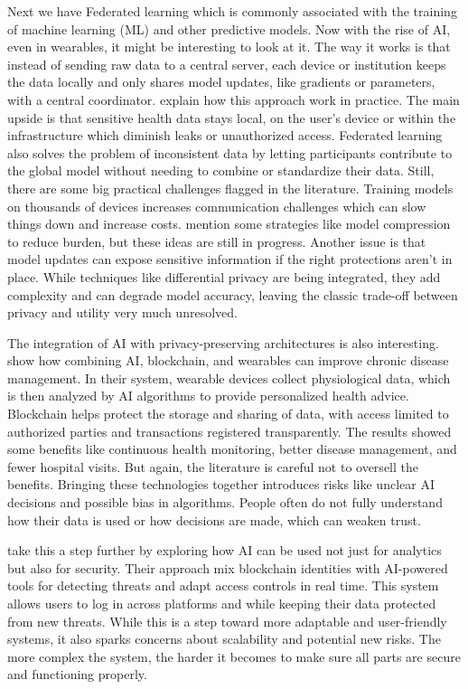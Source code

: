 	Next we have Federated learning which is commonly associated with the training of machine learning (ML) and other predictive models. Now with the rise of AI, even in wearables, it might be interesting to look at it. The way it works is that instead of sending raw data to a central server, each device or institution keeps the data locally and only shares model updates, like gradients or parameters, with a central coordinator. \cite{Xu2021} explain how this approach work in practice. The main upside is that sensitive health data stays local, on the user's device or within the infrastructure which diminish leaks or unauthorized access. Federated learning also solves the problem of inconsistent data by letting participants contribute to the global model without needing to combine or standardize their data. Still, there are some big practical challenges flagged in the literature. Training models on thousands of devices increases communication challenges which can slow things down and increase costs. \cite{Xu2021} mention some strategies like model compression to reduce burden, but these ideas are still in progress. Another issue is that model updates can expose sensitive information if the right protections aren't in place. While techniques like differential privacy are being integrated, they add complexity and can degrade model accuracy, leaving the classic trade-off between privacy and utility very much unresolved.

	The integration of AI with privacy-preserving architectures is also interesting. \cite{Xie2021} show how combining AI, blockchain, and wearables can improve chronic disease management. In their system, wearable devices collect physiological data, which is then analyzed by AI algorithms to provide personalized health advice. Blockchain helps protect the storage and sharing of data, with access limited to authorized parties and transactions registered transparently. The results showed some benefits like continuous health monitoring, better disease management, and fewer hospital visits. But again, the literature is careful not to oversell the benefits. Bringing these technologies together introduces risks like unclear AI decisions and possible bias in algorithms. People often do not fully understand how their data is used or how decisions are made, which can weaken trust.

	\cite{Heister2021} take this a step further by exploring how AI can be used not just for analytics but also for security. Their approach mix blockchain identities with AI-powered tools for detecting threats and adapt access controls in real time. This system allows users to log in across platforms and while keeping their data protected from new threats. While this is a step toward more adaptable and user-friendly systems, it also sparks concerns about scalability and potential new risks. The more complex the system, the harder it becomes to make sure all parts are secure and functioning properly.

